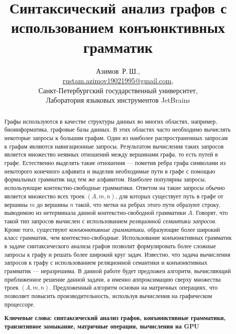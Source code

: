\documentclass [a4paper] {article}
\begin{document}
	\title{Синтаксический анализ графов с использованием конъюнктивных грамматик}
	\author{
		Азимов~Р.\,Ш., \\ \url {rustam.azimov19021995@gmail.com}, \\
		Санкт-Петербургский государственный университет, \\
		Лаборатория языковых инструментов JetBrains 
	}
	
	\maketitle
	
	\begin{abstract}
		Графы используются в качестве структуры данных во многих областях, например, биоинформатика, графовые базы данных. В этих областях часто необходимо вычислять некоторые запросы к большим графам. Один из наиболее распространенных запросам к графам являются навигационные запросы. Результатом вычисления таких запросов является множество неявных отношений между вершинами графа, то есть путей в графе. Естественно выделять такие отношения --- пометив ребра графа символами из некоторого конечного алфавита и выделив необходимые пути в графе с помощью формальных грамматик над тем же алфавитом. Наиболее популярны запросы, использующие контекстно-свободные грамматики. Ответом на такие запросы обычно является множество всех троек $(A, m, n)$, для которых существует путь в графе от вершины $m$ до вершины $n$ такой, что метки на ребрах этого пути образуют строку, выводимою из нетерминала данной контекстно-свободной грамматики $A$. Говорят, что такой тип запросов вычислен с использованием \textit{реляционной семантики запросов}. Кроме того, существуют \textit{конъюнктивные грамматики}, образующие более широкий класс грамматик, чем контекстно-свободные. Использование конъюнктивных грамматик в задаче синтаксического анализа графов позволит формулировать более сложные запросы к графу и решать более широкий круг задач. Известно, что задача вычисления запросов к графу с использованием реляционной семантики и конъюнктивных грамматик --- неразрешима. В данной работе будет предложен алгоритм, вычисляющий приближенное решение данной задачи, а именно аппроксимацию сверху множества троек $(A, m, n)$. Предложенный алгоритм основан на матричных операциях, что позволяет повысить производительность, используя вычисления на графическом процессоре.
		
		\vspace{1em}
		\textbf{Ключевые слова: синтаксический анализ графов, конъюнктивные грамматики, транзитивное замыкание, матричные операции, вычисления на GPU}  
	\end{abstract}
	
\end{document}
